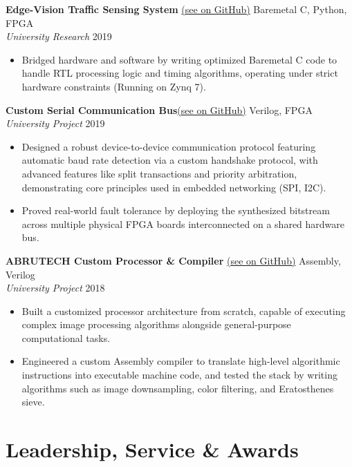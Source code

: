 \documentclass[letterpaper,10pt]{article}
\begin{document}
\vspace{6pt}
\noindent \textbf{Edge-Vision Traffic Sensing System} \href{https://github.com/abrutech/vision-traffic-soc}{(see on GitHub)} \hfill Baremetal C, Python, FPGA \\
\textit{University Research} \hfill 2019
\begin{itemize}
    \item Bridged hardware and software by writing optimized Baremetal C code to handle RTL processing logic and timing algorithms, operating under strict hardware constraints (Running on Zynq 7).
\end{itemize}

\vspace{6pt}
\noindent \textbf{Custom Serial Communication Bus}\href{https://github.com/abrutech/system-bus}{(see on GitHub)} \hfill Verilog, FPGA \\
\textit{University Project} \hfill 2019
\begin{itemize}
    \item Designed a robust device-to-device communication protocol featuring automatic baud rate detection via a custom handshake protocol, with advanced features like split transactions and priority arbitration, demonstrating core principles used in embedded networking (SPI, I2C).
    \item Proved real-world fault tolerance by deploying the synthesized bitstream across multiple physical FPGA boards interconnected on a shared hardware bus.
\end{itemize}

\vspace{6pt}
\noindent \textbf{ABRUTECH Custom Processor \& Compiler} \href{https://github.com/BlazeCode2/ABRUTECH_processor_automatic}{(see on GitHub)} \hfill Assembly, Verilog \\
\textit{University Project} \hfill 2018
\begin{itemize}
    \item Built a customized processor architecture from scratch, capable of executing complex image processing algorithms alongside general-purpose computational tasks.
    \item Engineered a custom Assembly compiler to translate high-level algorithmic instructions into executable machine code, and tested the stack by writing algorithms such as image downsampling, color filtering, and Eratosthenes sieve. 
\end{itemize}

\section{Leadership, Service \& Awards}
\end{document}
